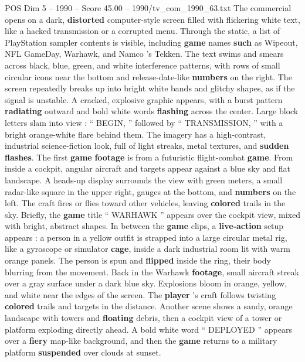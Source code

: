 \begin{textsample}{POS Dim 5 – 1990 – Score 45.00 – 1990/tv\_com\_1990\_63.txt}  \label{ex:f5_pos_001}
The commercial opens on a dark, \textbf{distorted} computer-style screen filled with flickering white text, like a hacked transmission or a corrupted menu.
Through the static, a list of PlayStation sampler contents is visible, including \textbf{game} names \textbf{such} as Wipeout, NFL GameDay, Warhawk, and Namco ’s Tekken.
The text swims and smears across black, blue, green, and white interference patterns, with rows of small circular icons near the bottom and release-date-like \textbf{numbers} on the right.
The screen repeatedly breaks up into bright white bands and glitchy shapes, as if the signal is unstable.
A cracked, explosive graphic appears, with a burst pattern \textbf{radiating} outward and bold white words \textbf{flashing} across the center.
Large block letters slam into view : “ BEGIN, ” followed by “ TRANSMISSION, ” with a bright orange-white flare behind them.
The imagery has a high-contrast, industrial science-fiction look, full of light streaks, metal textures, and \textbf{sudden} \textbf{flashes}.
The first \textbf{game} \textbf{footage} is from a futuristic flight-combat \textbf{game}.
From inside a cockpit, angular aircraft and targets appear against a blue sky and flat landscape.
A heads-up display surrounds the view with green meters, a small radar-like square in the upper right, gauges at the bottom, and \textbf{numbers} on the left.
The craft fires or flies toward other vehicles, leaving \textbf{colored} trails in the sky.
Briefly, the \textbf{game} title “ WARHAWK ” appears over the cockpit view, mixed with bright, abstract shapes.
In between the \textbf{game} clips, a \textbf{live-action} setup appears : a person in a yellow outfit is strapped into a large circular metal rig, like a gyroscope or simulator \textbf{cage}, inside a dark industrial room lit with warm orange panels.
The person is spun and \textbf{flipped} inside the ring, their body blurring from the movement.
Back in the Warhawk \textbf{footage}, small aircraft streak over a gray surface under a dark blue sky.
Explosions bloom in orange, yellow, and white near the edges of the screen.
The \textbf{player} ’s craft follows twisting \textbf{colored} trails and targets in the distance.
Another scene shows a sandy, orange landscape with towers and \textbf{floating} debris, then a cockpit view of a tower or platform exploding directly ahead.
A bold white word “ DEPLOYED ” appears over a \textbf{fiery} map-like background, and then the \textbf{game} returns to a military platform \textbf{suspended} over clouds at sunset.

\end{textsample}
